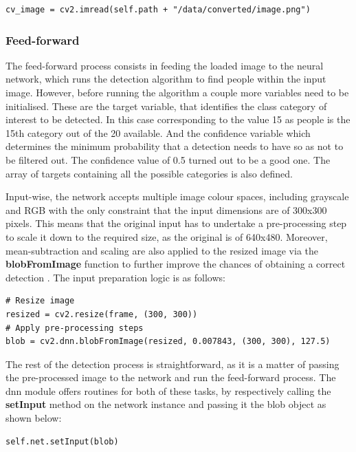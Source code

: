 \begin{lstlisting}
cv_image = cv2.imread(self.path + "/data/converted/image.png")
\end{lstlisting}

\subsubsection{Feed-forward}

The feed-forward process consists in feeding the loaded image to the neural network, which runs the detection algorithm to find people within the input image. However, before running the algorithm a couple more variables need to be initialised. These are the target variable, that identifies the class category of interest to be detected. In this case corresponding to the value 15 as people is the 15th category out of the 20 available. And the confidence variable which determines the minimum probability that a detection needs to have so as not to be filtered out. The confidence value of 0.5 turned out to be a good one. The array of targets containing all the possible categories is also defined.

Input-wise, the network accepts multiple image colour spaces, including grayscale and RGB with the only constraint that the input dimensions are of 300x300 pixels. This means that the original input has to undertake a pre-processing step to scale it down to the required size, as the original is of 640x480. Moreover, mean-subtraction and scaling are also applied to the resized image via the \textbf{blobFromImage} function to further improve the chances of obtaining a correct detection \cite{website:blobFromImage}. The input preparation logic is as follows:

\begin{lstlisting}
# Resize image
resized = cv2.resize(frame, (300, 300))
# Apply pre-processing steps
blob = cv2.dnn.blobFromImage(resized, 0.007843, (300, 300), 127.5)
\end{lstlisting}

The rest of the detection process is straightforward, as it is a matter of passing the pre-processed image to the network and run the feed-forward process. The dnn module offers routines for both of these tasks, by respectively calling the \textbf{setInput} method on the network instance and passing it the blob object as shown below:

\begin{lstlisting}
self.net.setInput(blob)
\end{lstlisting}

